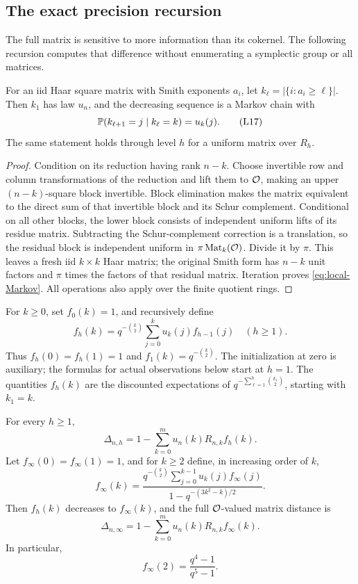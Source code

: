 \subsection{The exact precision recursion}

The full matrix is sensitive to more information than its cokernel.
The following recursion computes that difference without enumerating
a symplectic group or all matrices.

\begin{lemma}\label{lem:local-Markov}
For an iid Haar square matrix with Smith exponents \(a_i\), let
\(k_\ell=|\{i:a_i\ge\ell\}|\).
Then \(k_1\) has law \(u_n\), and the decreasing sequence is a Markov
chain with
\[
 \mathbb P(k_{\ell+1}=j\mid k_\ell=k)=u_k(j).
 \tag{L17}\label{eq:local-Markov}
\]
The same statement holds through level \(h\) for a uniform matrix
over \(R_h\).
\end{lemma}

\begin{proof}
Condition on its reduction having rank \(n-k\). Choose invertible
row and column transformations of the reduction and lift them to
\(\mathcal O\), making an upper \((n-k)\)-square block invertible.
Block elimination makes the matrix equivalent to the direct sum
of that invertible block and its Schur complement.
Conditional on all other blocks, the lower block consists of
independent uniform lifts of its residue matrix. Subtracting the
Schur-complement correction is a translation, so the residual
block is independent uniform in \(\pi\operatorname{Mat}_k(\mathcal O)\).
Divide it by \(\pi\). This leaves a fresh iid \(k\times k\) Haar
matrix; the original Smith form has \(n-k\) unit factors and
\(\pi\) times the factors of that residual matrix.
Iteration proves \eqref{eq:local-Markov}. All operations also
apply over the finite quotient rings.
\end{proof}

For \(k\ge0\), set \(f_0(k)=1\), and recursively define
\[
 f_h(k)=q^{-\binom k2}\sum_{j=0}^k u_k(j)f_{h-1}(j)
 \quad(h\ge1).
 \tag{L18}\label{eq:local-f-recursion}
\]
Thus \(f_h(0)=f_h(1)=1\) and \(f_1(k)=q^{-\binom k2}\).
The initialization at zero is auxiliary; the formulas for actual
observations below start at \(h=1\).
The quantities \(f_h(k)\) are the discounted expectations of
\(q^{-\sum_{\ell=1}^h\binom{k_\ell}{2}}\), starting with \(k_1=k\).

\begin{theorem}
\label{thm:local-precision}
For every \(h\ge1\),
\[
 \Delta_{n,h}
  =1-\sum_{k=0}^m u_n(k)R_{n,k}f_h(k).
 \tag{L19}\label{eq:local-Delta}
\]
Let \(f_\infty(0)=f_\infty(1)=1\), and for \(k\ge2\) define, in
increasing order of \(k\),
\[
 f_\infty(k)=
 \frac{q^{-\binom k2}\sum_{j=0}^{k-1}u_k(j)f_\infty(j)}
      {1-q^{-(3k^2-k)/2}}.
 \tag{L20}\label{eq:local-f-infinity}
\]
Then \(f_h(k)\) decreases to \(f_\infty(k)\), and the full
\(\mathcal O\)-valued matrix distance is
\[
 \Delta_{n,\infty}
  =1-\sum_{k=0}^m u_n(k)R_{n,k}f_\infty(k).
 \tag{L21}\label{eq:local-Delta-infinity}
\]
In particular,
\[
 f_\infty(2)=\frac{q^4-1}{q^5-1}.
 \tag{L22}\label{eq:local-f2}
\]
\end{theorem}

